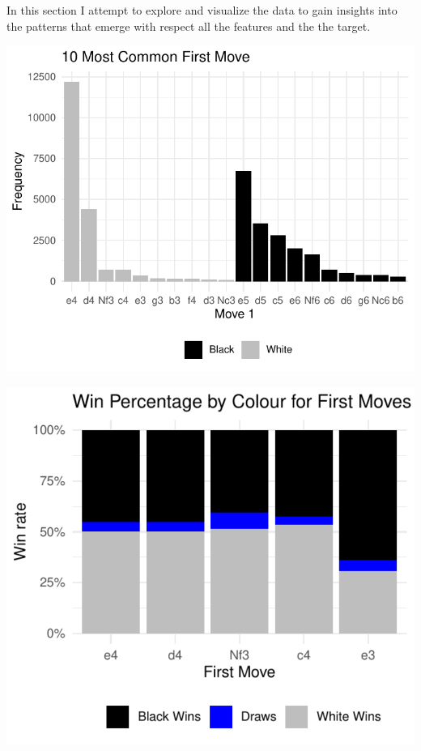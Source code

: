 \documentclass[12pt,preprint, authoryear]{elsarticle}
\let\origfigure\figure
\let\endorigfigure\endfigure
\renewenvironment{figure}[1][2] {
    \expandafter\origfigure\expandafter[H]
} {
    \endorigfigure
}
\numberwithin{equation}{section}
\numberwithin{figure}{section}
\numberwithin{table}{section}
\begin{document}
In this section I attempt to explore and visualize the data to gain
insights into the patterns that emerge with respect all the features and
the the target.

\begin{figure}[H]

{\centering \includegraphics{WriteUp_files/figure-latex/commove1-1} 

}

\caption{Most Common Opening Moves by Colour\label{Figure1}}\label{fig:commove1}
\end{figure}

\begin{figure}[H]

{\centering \includegraphics{WriteUp_files/figure-latex/firstmovepropwins-1} 

}

\caption{Proportions of Outcomes by White First Move\label{Figure2}}\label{fig:firstmovepropwins}
\end{figure}
\end{document}
